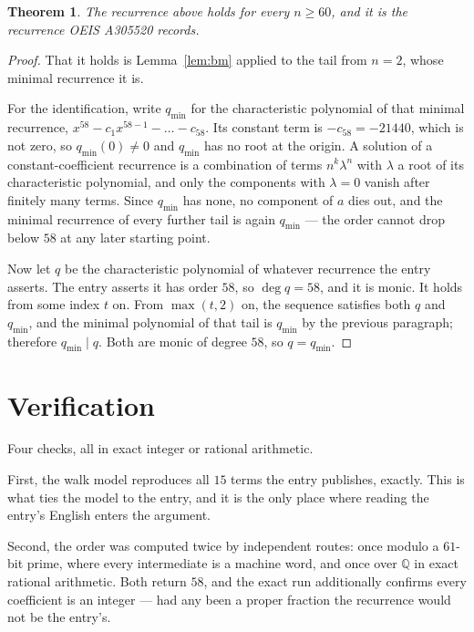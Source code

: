 \documentclass[11pt,a4paper]{article}
\theoremstyle{plain}
\newtheorem{theorem}{Theorem}
\theoremstyle{definition}
\begin{document}
\begin{theorem}
The recurrence above holds for every $n\ge60$, and it is the recurrence OEIS A305520 records.
\end{theorem}

\begin{proof}
That it holds is Lemma~\ref{lem:bm} applied to the tail from $n=2$, whose minimal
recurrence it is.

For the identification, write $q_{\min}$ for the characteristic polynomial of that minimal
recurrence, $x^{58}-c_1x^{58-1}-\dots-c_{58}$. Its constant term is
$-c_{58}=-21440$, which is not zero, so $q_{\min}(0)\neq0$ and $q_{\min}$ has no
root at the origin. A solution of a constant-coefficient recurrence is a combination of terms
$n^{k}\lambda^{n}$ with $\lambda$ a root of its characteristic polynomial, and only the
components with $\lambda=0$ vanish after finitely many terms. Since $q_{\min}$ has none, no
component of $a$ dies out, and the minimal recurrence of every further tail is again
$q_{\min}$ --- the order cannot drop below $58$ at any later starting point.

Now let $q$ be the characteristic polynomial of whatever recurrence the entry asserts. The
entry asserts it has order $58$, so $\deg q=58$, and it is monic. It holds from some
index $t$ on. From $\max(t,2)$ on, the sequence satisfies both $q$ and $q_{\min}$, and
the minimal polynomial of that tail is $q_{\min}$ by the previous paragraph; therefore
$q_{\min}\mid q$. Both are monic of degree $58$, so $q=q_{\min}$.
\end{proof}

\section{Verification}

Four checks, all in exact integer or rational arithmetic.

First, the walk model reproduces all $15$ terms the entry publishes, exactly. This is
what ties the model to the entry, and it is the only place where reading the entry's English
enters the argument.

Second, the order was computed twice by independent routes: once modulo a $61$-bit prime, where
every intermediate is a machine word, and once over $\mathbb{Q}$ in exact rational arithmetic.
Both return $58$, and the exact run additionally confirms every coefficient is an integer
--- had any been a proper fraction the recurrence would not be the entry's.
\end{document}
